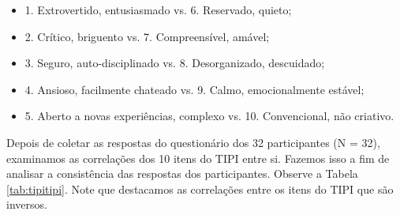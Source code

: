 \begin{itemize}
\item 1. Extrovertido, entusiasmado vs. 6. Reservado, quieto;
\item 2. Crítico, briguento vs. 7. Compreensível, amável;
\item 3. Seguro, auto-disciplinado vs. 8. Desorganizado, descuidado;
\item 4. Ansioso, facilmente chateado vs. 9. Calmo, emocionalmente estável;
\item 5. Aberto a novas experiências, complexo vs. 10. Convencional, não criativo.
\end{itemize}

Depois de coletar as respostas do questionário dos 32 participantes (N = 32), examinamos as correlações dos 10 itens do TIPI entre si.
Fazemos isso a fim de analisar a consistência das respostas dos participantes. Observe a Tabela \ref{tab:tipitipi}.
Note que destacamos as correlações entre os itens do TIPI que são inversos. 

